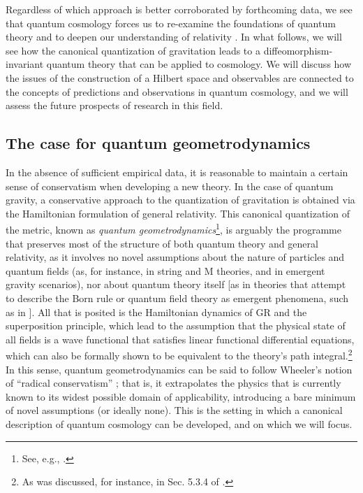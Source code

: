 \documentclass[12pt]{iopart}
\begin{document}
Regardless of which approach is better corroborated by forthcoming data, we see that quantum cosmology forces us to re-examine the foundations of quantum theory and to deepen our understanding of relativity \citep{Bojowald:2010cj}. In what follows, we will see how the canonical quantization of gravitation leads to a diffeomorphism-invariant quantum theory that can be applied to cosmology. We will discuss how the issues of the construction of a Hilbert space and observables are connected to the concepts of predictions and observations in quantum cosmology, and we will assess the future prospects of research in this field.

\subsection{The case for quantum geometrodynamics}
In the absence of sufficient empirical data, it is reasonable to maintain a certain sense of conservatism when developing a new theory. In the case of quantum gravity, a conservative approach to the quantization of gravitation is obtained via the Hamiltonian formulation of general relativity. This canonical quantization of the metric, known as {\em quantum geometrodynamics}\footnote{See, e.g., \citet{Kiefer:book,Kiefer:2008bs}.}, is arguably the programme that preserves most of the structure of both quantum theory and general relativity, as it involves no novel assumptions about the nature of particles and quantum fields (as, for instance, in string and M theories, and in emergent gravity scenarios), nor about quantum theory itself [as in theories that attempt to describe the Born rule or quantum field theory as emergent phenomena, such as in \citet{Adler:book}]. All that is posited is the Hamiltonian dynamics of GR and the superposition principle, which lead to the assumption that the physical state of all fields is a wave functional that satisfies linear functional differential equations, which can also be formally shown to be equivalent to the theory's path integral.\footnote{As was discussed, for instance, in Sec. 5.3.4 of \citet{Kiefer:book}.} In this sense, quantum geometrodynamics can be said to follow Wheeler's notion of ``radical conservatism'' \citep{Thorne:2019scz}; that is, it extrapolates the physics that is currently known to its widest possible domain of applicability, introducing a bare minimum of novel assumptions (or ideally none). This is the setting in which a canonical description of quantum cosmology can be developed, and on which we will focus.
\end{document}
